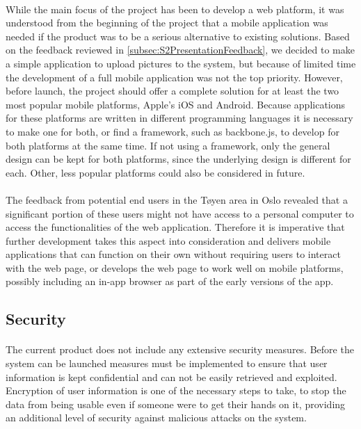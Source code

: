 \paragraph{} While the main focus of the project has been to develop a web platform, it was understood from the beginning of the project that a mobile application was needed if the product was to be a serious alternative to existing solutions. Based on the feedback reviewed in \ref{subsec:S2PresentationFeedback}, we decided to make a simple application to upload pictures to the system, but because of limited time the development of a full mobile application was not the top priority. However, before launch,  the project should offer a complete solution for at least the two most popular mobile platforms, Apple's iOS and Android. Because applications for these platforms are written in different programming languages it is necessary to make one for both, or find a framework, such as backbone.js, to develop for both platforms at the same time. If not using a framework, only the general design can be kept for both platforms, since the underlying design is different for each. Other, less popular platforms could also be considered in future.
\paragraph{} The feedback from potential end users in the Tøyen area in Oslo revealed that a significant portion of these users might not have access to a personal computer to access the functionalities of the web application. Therefore it is imperative that further development takes this aspect into consideration and delivers mobile applications that can function on their own without requiring users to interact with the web page, or develops the web page to work well on mobile platforms, possibly including an in-app browser as part of the early versions of the app.

\subsection{Security}
\label{subsec:FurtherRequiredSecurity}

\paragraph{} The current product does not include any extensive security measures. Before the system can be launched measures must be implemented to ensure that user information is kept confidential and can not be easily retrieved and exploited. Encryption of user information is one of the necessary steps to take, to stop the data from being usable even if someone were to get their hands on it, providing an additional level of security against malicious attacks on the system.
